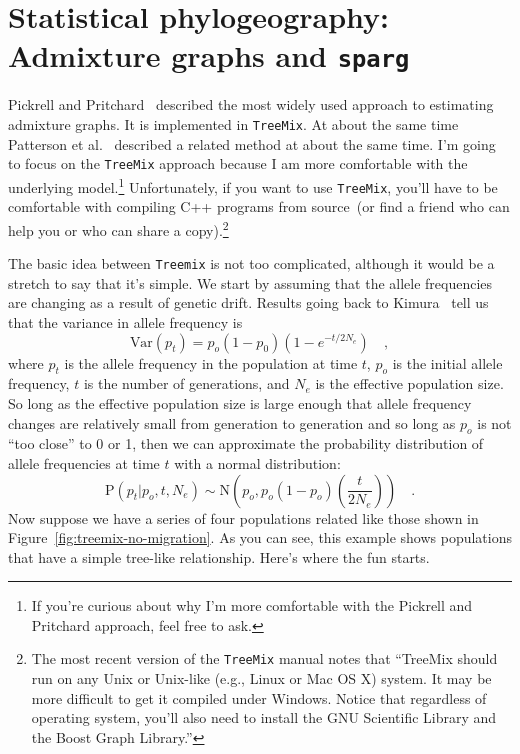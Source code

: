 \chapter{Statistical phylogeography: Admixture graphs and {\tt sparg}}

Pickrell and Pritchard~\cite{Pickrell-Pritchard-2012} described the
most widely used approach to estimating admixture graphs. It is
implemented in {\tt TreeMix}. At about the same time
Patterson et al.~\cite{Patterson-etal-2012} described a related method
at about the same time. I'm going to focus on the {\tt TreeMix}
approach because I am more comfortable with the underlying
model.\footnote{If you're curious about why I'm more comfortable with
  the Pickrell and Pritchard approach, feel free to ask.}
Unfortunately, if you want to use {\tt TreeMix}, you'll have to be comfortable
with compiling C++ programs from source~(or find a friend who can help
you or who can share a copy).\footnote{The most recent version of the
  {\tt TreeMix} manual notes that ``TreeMix should run on any Unix or
  Unix-like (e.g., Linux or Mac OS X) system. It may be more difficult
  to get it compiled under Windows. Notice that regardless of
  operating system, you'll also need to install the GNU Scientific
  Library and the Boost Graph Library.''}

The basic idea between {\tt Treemix} is not too complicated, although
it would be a stretch to say that it's simple. We start by assuming
that the allele frequencies are changing as a result of genetic
drift. Results going back to Kimura~\cite{Kimura-1955} tell us that
the variance in allele frequency is
\[
  \mbox{Var}(p_t) = p_o(1-p_0)\left(1 - e^{-t/2N_e}\right) \quad ,
\]
where $p_t$ is the allele frequency in the population at time $t$,
$p_o$ is the initial allele frequency, $t$ is the number of
generations, and $N_e$ is the effective population size. So long as
the effective population size is large enough that allele frequency
changes are relatively small from generation to generation and so long
as $p_o$ is not ``too close'' to 0 or 1, then we can approximate the
probability distribution of allele frequencies at time $t$ with a
normal distribution:
\[
  \mbox{P}(p_t|p_o,t,N_e) \sim \mbox{N}\left(p_o,
    p_o(1-p_o)\left(\frac{t}{2N_e}\right)\right) \quad .
\]
Now suppose we have a series of four populations related like those
shown in Figure~\ref{fig:treemix-no-migration}. As you can see, this
example shows populations that have a simple tree-like
relationship. Here's where the fun starts.

